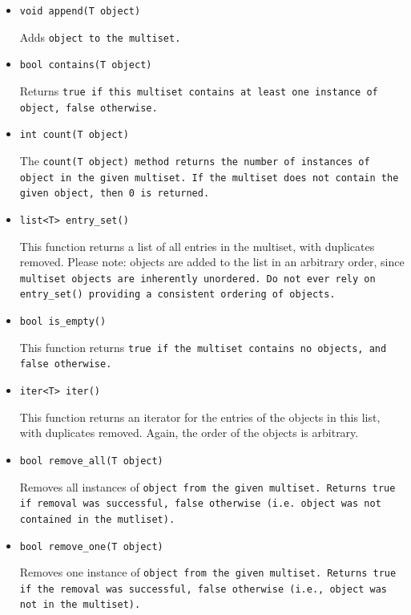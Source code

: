 \documentclass{article}
\begin{document}
\begin{itemize}

\item[] \tt void append(T object) \rm

Adds \tt object \rm to the \tt multiset\rm.

\item[] \tt bool contains(T object) \rm

Returns \tt true \rm if this \tt multiset \rm contains at least one instance of
\tt object\rm, \tt false \rm otherwise.

\item[] \tt int count(T object) \rm

The \tt count(T object) \rm method returns the number of instances of \tt object \rm
in the given \tt multiset\rm. If the \tt multiset \rm does not contain the given
object, then \tt 0 \rm is returned. 

\item[] \tt list<T> entry\_set() \rm

This function returns a list of all entries in the multiset, with duplicates removed.
Please note: objects are added to the list in an arbitrary order, since \tt multiset
\rm objects are inherently unordered. Do not ever rely on \tt entry\_set() \rm 
providing a consistent ordering of objects.

\item[] \tt bool is\_empty() \rm

This function returns \tt true \rm if the \tt multiset \rm contains no objects, and
\tt false \rm otherwise.

\item[] \tt iter<T> iter() \rm

This function returns an iterator for the entries of the objects in this list,
with duplicates removed. Again, the order of the objects is arbitrary. 

\item[] \tt bool remove\_all(T object) \rm

Removes all instances of \tt object \rm from the given \tt multiset\rm. Returns
\tt true \rm if removal was successful, \tt false \rm otherwise (i.e. \tt object \rm
was not contained in the \tt mutliset\rm).

\item[] \tt bool remove\_one(T object) \rm

Removes one instance of \tt object \rm from the given \tt multiset\rm. Returns
\tt true \rm if the removal was successful, \tt false \rm otherwise (i.e.,
\tt object \rm was not in the \tt multiset\rm).

\end{itemize}
\end{document}
